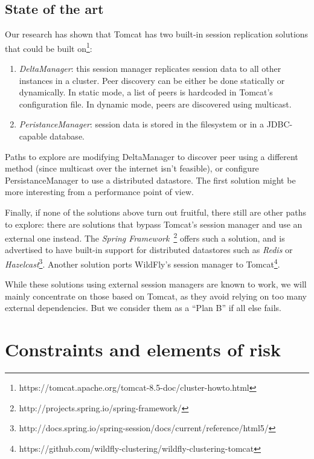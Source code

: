 \documentclass[11pt,a4paper]{article}
\begin{document}
\subsection{State of the art}

Our research has shown that Tomcat has two built-in session replication
solutions that could be built
on\footnote{https://tomcat.apache.org/tomcat-8.5-doc/cluster-howto.html}:

\begin{enumerate}
    \item \emph{DeltaManager}: this session manager replicates session data to
        all other instances in a cluster. Peer discovery can be either be done
        statically or dynamically. In static mode, a list of peers is hardcoded
        in Tomcat's configuration file. In dynamic mode, peers are discovered
        using multicast.

    \item \emph{PeristanceManager}: session data is stored in the filesystem or
        in a JDBC-capable database.
\end{enumerate}

Paths to explore are modifying DeltaManager to discover peer using a different
method (since multicast over the internet isn't feasible), or configure
PersistanceManager to use a distributed datastore. The first solution might be
more interesting from a performance point of view.

Finally, if none of the solutions above turn out fruitful, there still are
other paths to explore: there are solutions that bypass Tomcat's session
manager and use an external one instead. The \emph{Spring
    Framework}~\footnote{http://projects.spring.io/spring-framework/} offers
such a solution, and is advertised to have built-in support for distributed
datastores such as \emph{Redis} or
\emph{Hazelcast}\footnote{http://docs.spring.io/spring-session/docs/current/reference/html5/}.
Another solution ports WildFly's session manager to
Tomcat\footnote{https://github.com/wildfly-clustering/wildfly-clustering-tomcat}.

While these solutions using external session managers are known to work, we
will mainly concentrate on those based on Tomcat, as they avoid relying on too
many external dependencies. But we consider them as a ``Plan B'' if all else
fails.

\section{Constraints and elements of risk}
\end{document}
